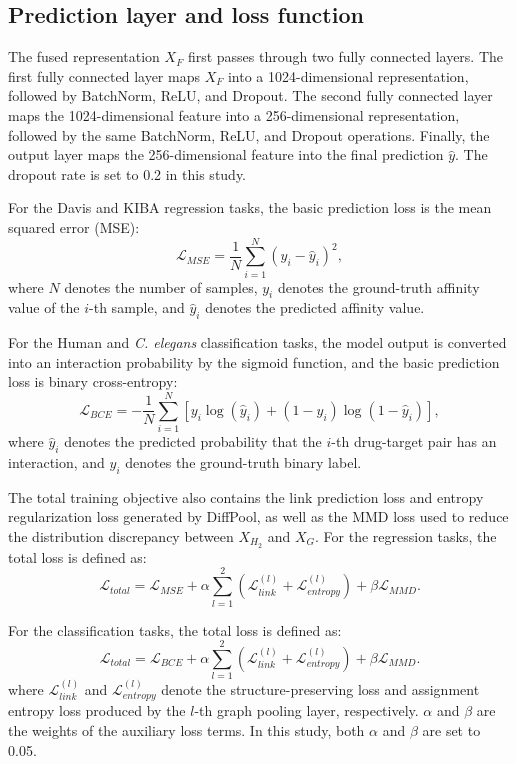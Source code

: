 \documentclass[pdflatex,sn-mathphys-num]{sn-jnl}%
\theoremstyle{thmstyleone}%
\theoremstyle{thmstyletwo}%
\theoremstyle{thmstylethree}%
\begin{document}
\subsection{Prediction layer and loss function}\label{subsec:prediction_loss}

The fused representation $X_F$ first passes through two fully connected layers. The first fully connected layer maps $X_F$ into a 1024-dimensional representation, followed by BatchNorm, ReLU, and Dropout. The second fully connected layer maps the 1024-dimensional feature into a 256-dimensional representation, followed by the same BatchNorm, ReLU, and Dropout operations. Finally, the output layer maps the 256-dimensional feature into the final prediction $\hat{y}$. The dropout rate is set to 0.2 in this study.

For the Davis and KIBA regression tasks, the basic prediction loss is the mean squared error (MSE):
\begin{equation}
\mathcal{L}_{MSE}=\frac{1}{N}\sum_{i=1}^{N}\left(y_i-\hat{y}_i\right)^2,
\end{equation}
where $N$ denotes the number of samples, $y_i$ denotes the ground-truth affinity value of the $i$-th sample, and $\hat{y}_i$ denotes the predicted affinity value.

For the Human and \textit{C. elegans} classification tasks, the model output is converted into an interaction probability by the sigmoid function, and the basic prediction loss is binary cross-entropy:
\begin{equation}
\mathcal{L}_{BCE}=-\frac{1}{N}\sum_{i=1}^{N}\left[y_i\log\left(\hat{y}_i\right)+\left(1-y_i\right)\log\left(1-\hat{y}_i\right)\right],
\end{equation}
where $\hat{y}_i$ denotes the predicted probability that the $i$-th drug-target pair has an interaction, and $y_i$ denotes the ground-truth binary label.

The total training objective also contains the link prediction loss and entropy regularization loss generated by DiffPool, as well as the MMD loss used to reduce the distribution discrepancy between $X_{H_2}$ and $X_G$. For the regression tasks, the total loss is defined as:
\begin{equation}
\mathcal{L}_{total}
=
\mathcal{L}_{MSE}
+\alpha\sum_{l=1}^{2}\left(\mathcal{L}_{link}^{(l)}+\mathcal{L}_{entropy}^{(l)}\right)
+\beta\mathcal{L}_{MMD}.
\end{equation}

For the classification tasks, the total loss is defined as:
\begin{equation}
\mathcal{L}_{total}
=
\mathcal{L}_{BCE}
+\alpha\sum_{l=1}^{2}\left(\mathcal{L}_{link}^{(l)}+\mathcal{L}_{entropy}^{(l)}\right)
+\beta\mathcal{L}_{MMD}.
\end{equation}
where $\mathcal{L}_{link}^{(l)}$ and $\mathcal{L}_{entropy}^{(l)}$ denote the structure-preserving loss and assignment entropy loss produced by the $l$-th graph pooling layer, respectively. $\alpha$ and $\beta$ are the weights of the auxiliary loss terms. In this study, both $\alpha$ and $\beta$ are set to 0.05.
\end{document}
